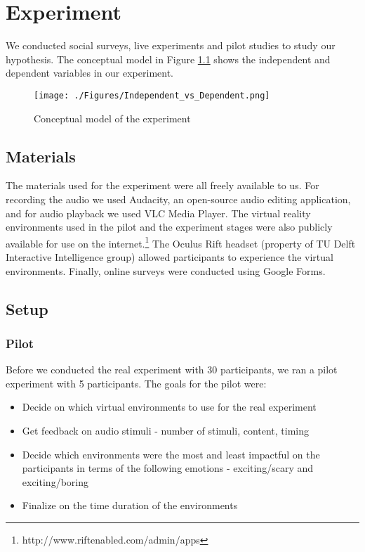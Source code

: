\documentclass[Method.tex]{subfiles}
\begin{document}
\chapter{Experiment}
We conducted social surveys, live experiments and pilot studies to study our hypothesis. The conceptual model in Figure \ref{fig:independent_vs_dependent} shows the independent and dependent variables in our experiment.

\begin{figure} [H]
	\centering
	\texttt{[image: ./Figures/Independent\_vs\_Dependent.png]}
	\caption{Conceptual model of the experiment}
	\label{fig:independent_vs_dependent}
\end{figure}

\section{Materials}
The materials used for the experiment were all freely available to us. For recording the audio we used Audacity, an open-source audio editing application, and for audio playback we used VLC Media Player. The virtual reality environments used in the pilot and the experiment stages were also publicly available for use on the internet.\footnote{http://www.riftenabled.com/admin/apps} The Oculus Rift headset (property of TU Delft Interactive Intelligence group) allowed participants to experience the virtual environments. Finally, online surveys were conducted using Google Forms.

\section{Setup}

\subsection{Pilot}
Before we conducted the real experiment with 30 participants, we ran a pilot experiment with 5 participants. The goals for the pilot were:

\begin{itemize}
\item Decide on which virtual environments to use for the real experiment
\item Get feedback on audio stimuli - number of stimuli, content, timing
\item Decide which environments were the most and least impactful on the participants in terms of the following emotions - exciting/scary and exciting/boring
\item Finalize on the time duration of the environments
\end{itemize}
\end{document}
